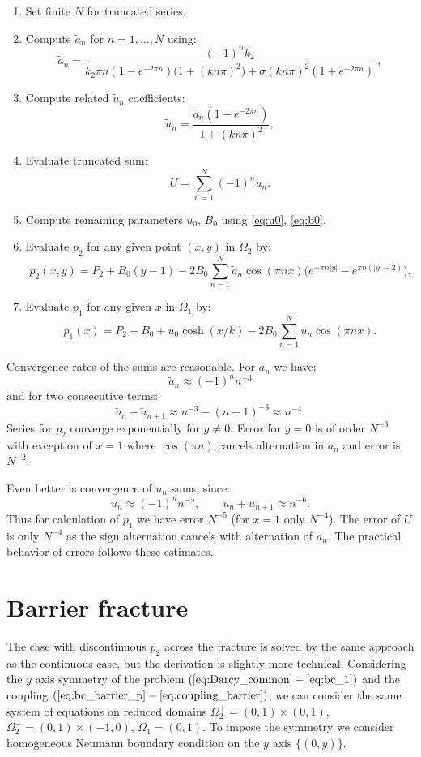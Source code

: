 \documentclass{elsarticle}
\begin{document}
\begin{enumerate}
    \item Set finite $N$ for truncated series. 
    \item Compute $\tilde a_n$ for $n = 1, \dots, N$ using:
    \[
        \tilde a_n = \frac{(-1)^n k_2}{ k_2 \pi n (1 - e^{-2\pi n}) \big(1 + (k n \pi)^2\big) 
            + \sigma (k n \pi)^2 (1 + e^{-2\pi n})} \ , 
    \]
    \item Compute related $\tilde u_n$ coefficients:
    \[
        \tilde u_n = \frac{\tilde a_n (1 - e^{-2\pi n})}{1 + (k n \pi)^2}, 
    \]
    \item Evaluate truncated sum:
    \[
        U =  \sum_{n=1}^{N} (-1)^n u_n.
    \]
    \item Compute remaining parameters $u_0$, $B_0$ using \eqref{eq:u0}, \eqref{eq:b0}.
    \item Evaluate $p_2$ for any given point $(x,y)$ in $\Omega_2$ by:
    \[
        p_2(x,y) = P_2 + B_0(y-1) -2B_0 \sum_{n=1}^N \tilde a_n \cos(\pi n x) 
        \Big( e^{-\pi n |y|} - e^{\pi n (|y|-2)}\Big).
    \]
    \item Evaluate $p_1$ for any given $x$ in $\Omega_1$ by:
    \[
        p_1(x) = P_2 - B_0 + u_0 \cosh(x/k) - 2 B_0 \sum_{n=1}^N  u_n \cos(\pi n x). 
    \]    
\end{enumerate}

Convergence rates of the sums are reasonable. For $a_n$ we have:
\[
    \tilde a_n \approx (-1)^n n^{-3} 
\]
and for two consecutive terms:
\[
    \tilde a_n + \tilde a_{n+1} \approx n^{-3} - (n+1)^{-3} \approx  n^{-4}. 
\]
Series for $p_2$ converge exponentially for $y\ne 0$. Error for $y=0$ is of order $N^{-3}$ with exception
of  $x=1$ where $\cos(\pi n)$ cancels alternation in $a_n$ and error is $N^{-2}$.

Even better is convergence of $u_n$ sums, since:
\[
    u_n \approx (-1)^n n^{-5},\qquad u_n+u_{n+1} \approx  n^{-6}.
\]
Thus for calculation of $p_1$ we have error  $N^{-5}$ (for $x=1$ only $N^{-4}$). The error of $U$ is only $N^{-4}$ 
as the sign alternation cancels with alternation of $a_n$.
The practical behavior of errors follows these estimates.



\section{Barrier fracture}
\label{sec:barrier_frac}
The case with discontinuous $p_2$ across the fracture is solved by the same approach as the continuous case, 
but the derivation is slightly more technical. Considering the $y$ axis symmetry of the problem $(\ref{eq:Darcy_common} - \ref{eq:bc_1})$ and 
the coupling $(\ref{eq:bc_barrier_p} - \ref{eq:coupling_barrier})$, we can consider the same system of equations 
on reduced domains $\Omega_2^+ = (0,1)\times (0,1)$, $\Omega_2^- = (0,1)\times(-1,0)$,
$\Omega_1 = (0,1)$. To impose the symmetry we consider homogeneous Neumann boundary condition on the $y$ axis $\{(0,y)\}$.
\end{document}
